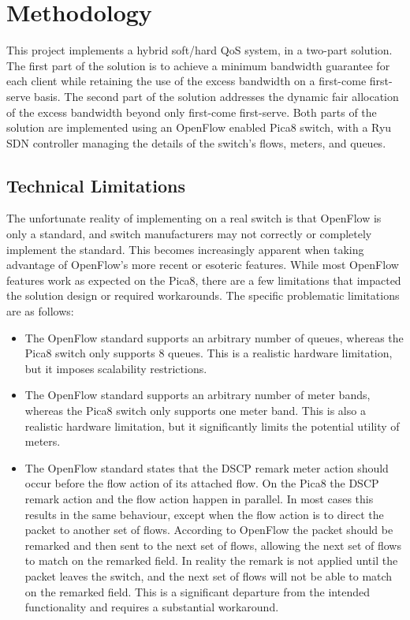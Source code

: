 \documentclass[accepted,single]{gipaper}
\begin{document}
\section{Methodology}
\label{methodology}

This project implements a hybrid soft/hard QoS system, in a two-part solution. The first part of the solution is to achieve a minimum bandwidth guarantee for each client while retaining the use of the excess bandwidth on a first-come first-serve basis. The second part of the solution addresses the dynamic fair allocation of the excess bandwidth beyond only first-come first-serve. Both parts of the solution are implemented using an OpenFlow enabled Pica8 switch, with a Ryu SDN controller managing the details of the switch's flows, meters, and queues.

\subsection{Technical Limitations}
\label{tech_limitations}

The unfortunate reality of implementing on a real switch is that OpenFlow is only a standard, and switch manufacturers may not correctly or completely implement the standard. This becomes increasingly apparent when taking advantage of OpenFlow's more recent or esoteric features. While most OpenFlow features work as expected on the Pica8, there are a few limitations that impacted the solution design or required workarounds. The specific problematic limitations are as follows: 

\begin{itemize}
\item The OpenFlow standard supports an arbitrary number of queues, whereas the Pica8 switch only supports 8 queues. This is a realistic hardware limitation, but it imposes scalability restrictions.
\item The OpenFlow standard supports an arbitrary number of meter bands, whereas the Pica8 switch only supports one meter band. This is also a realistic hardware limitation, but it significantly limits the potential utility of meters.
\item The OpenFlow standard states that the DSCP remark meter action should occur before the flow action of its attached flow. On the Pica8 the DSCP remark action and the flow action happen in parallel. In most cases this results in the same behaviour, except when the flow action is to direct the packet to another set of flows. According to OpenFlow the packet should be remarked and then sent to the next set of flows, allowing the next set of flows to match on the remarked field. In reality the remark is not applied until the packet leaves the switch, and the next set of flows will not be able to match on the remarked field. This is a significant departure from the intended functionality and requires a substantial workaround.
\end{itemize}
\end{document}

